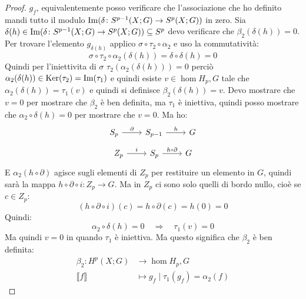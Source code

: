 \begin{proof}
  $ g_f $, equivalentemente posso verificare che l'associazione che ho definito
  mandi tutto il modulo $ \mathrm{Im}( \delta \colon S^{p-1}(X;G) \to S^p(X;G) ) $ in zero. Sia
  $ \delta (h) \in \mathrm{Im}( \delta \colon S^{p-1}(X;G) \to S^p(X;G) ) \subseteq S^p $ devo verificare che
  $ \beta_2(\delta(h)) = 0 $. Per trovare l'elemento $ g_{\delta(h)} $ applico $ \sigma \circ \tau_2 \circ \alpha_2 $
  e uso la commutatività:
  \[
    \sigma \circ \tau_2 \circ \alpha_2 (\delta(h)) = \delta \circ \delta (h) = 0
  \]
  Quindi per l'iniettivita di $ \sigma $ $ \tau_2(\alpha_2(\delta(h))) = 0 $ perciò
  $ \alpha_2(\delta(h)) \in \mathrm{Ker}( \tau_2) = \mathrm{Im}( \tau_1 ) $ e quindi esiste
  $ v \in \hom{H_p,G} $ tale che $ \alpha_2(\delta(h)) = \tau_1(v) $ e quindi si definisce
  $ \beta_2(\delta(h)) = v $. Devo mostrare che $ v = 0 $ per mostrare che
  $ \beta_2 $ è ben definita, ma $ \tau_1 $ è iniettiva, quindi posso mostrare che
  $ \alpha_2 \circ \delta (h) = 0 $ per mostrare che $ v = 0 $. Ma ho:
  \[
    \begin{tikzcd}
      S_p \rar{\partial} & S_{p-1} \rar{h} & G
    \end{tikzcd}
  \]
  \[
    \begin{tikzcd}
      Z_p \rar{i} & S_{p} \rar{h \circ \partial} & G
    \end{tikzcd}
  \]
  E $ \alpha_2(h \circ \partial) $ agisce sugli elementi di $ Z_p $ per restituire un elemento
  in $ G $, quindi sarà la mappa $ h \circ \partial \circ i \colon Z_p \to G $. Ma in
  $ Z_p $ ci sono solo quelli di bordo nullo, cioè se $ c \in Z_p $:
  \[
    (h \circ \partial \circ i)(c) = h \circ \partial(c) = h(0) = 0
  \]
  Quindi:
  \[
    \alpha_2 \circ \delta(h) = 0 \quad \Rightarrow \quad \tau_1(v) = 0
  \]
  Ma quindi $ v = 0 $ in quando $ \tau_1 $ è iniettiva. Ma questo significa
  che $ \beta_2 $ è ben definita:
  \begin{align*}
    \beta_2 \colon H^p(X;G) & \to \hom{H_p,G} \\
    \llbracket f \rrbracket & \mapsto g_f \; | \; \tau_1(g_f) = \alpha_2(f)
  \end{align*}


\end{proof}
